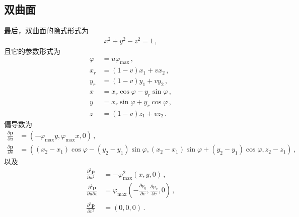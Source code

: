\subsection{双曲面}\label{sub:双曲面}
最后，双曲面的隐式形式为
\begin{align*}
    x^2+y^2-z^2=1\, ,
\end{align*}
且它的参数形式为
\begin{align*}
    \varphi & =u\varphi_{\max}\, ,               \\
    x_r     & =(1-v)x_1+vx_2\, ,                 \\
    y_r     & =(1-v)y_1+vy_2\, ,                 \\
    x       & =x_r\cos\varphi-y_r\sin\varphi\, , \\
    y       & =x_r\sin\varphi+y_r\cos\varphi\, , \\
    z       & =(1-v)z_1+vz_2\, .
\end{align*}
偏导数为
\begin{align*}
    \frac{\partial\bm p}{\partial u} & =(-\varphi_{\max}y,\varphi_{\max}x,0)\, ,                                                          \\
    \frac{\partial\bm p}{\partial v} & =((x_2-x_1)\cos\varphi-(y_2-y_1)\sin\varphi,(x_2-x_1)\sin\varphi+(y_2-y_1)\cos\varphi,z_2-z_1)\, ,
\end{align*}
以及
\begin{align*}
    \frac{\partial^2\bm p}{\partial u^2}         & =-\varphi_{\max}^2(x,y,0)\, ,                                                                      \\
    \frac{\partial^2\bm p}{\partial u\partial v} & =\varphi_{\max}\left(-\frac{\partial p_y}{\partial v},\frac{\partial p_x}{\partial v},0\right)\, , \\
    \frac{\partial^2\bm p}{\partial v^2}         & =(0,0,0)\, .
\end{align*}